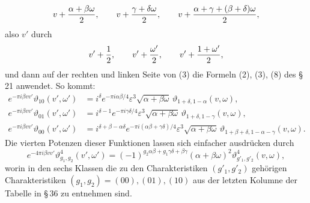 \documentclass[11pt]{article}
\providecommand{\tht}{\vartheta}
\begin{document}
\[
v+{\alpha+
\beta\omega\over2},
\qquad
v+{\gamma+\delta\omega\over2},
\qquad
v+{\alpha+
\gamma+(
\beta+
\delta)\omega\over2},
\]
also $v\prime$ durch
\[
v'+{1\over2},
\qquad v'+{\omega'\over2},
\qquad v'+{1+
\omega'\over2},
\]
und dann auf der rechten und linken Seite von (3) die Formeln (2), (3), (8) des \S\,21 anwendet. So kommt:
\begin{align}
e^{-\pi i\beta vv'}\tht_{10}(v',\omega')
&=i^\delta e^{-\pi i\alpha\beta/4}\varepsilon^3\sqrt{\alpha+
\beta\omega}\,\tht_{1+
\delta,1-
\alpha}(v,
\omega), \tag{4}\\
e^{-\pi i\beta vv'}\tht_{01}(v',\omega')
&=i^{\delta-1}e^{-\pi i\gamma\delta/4}\varepsilon^3\sqrt{\alpha+
\beta\omega}\,\tht_{1+
\delta,1-
\gamma}(v,
\omega), \tag{5}\\
e^{-\pi i\beta vv'}\tht_{00}(v',\omega')
&=i^{\delta+
\beta-
\alpha\delta}e^{-\pi i(
\alpha\beta+
\gamma\delta)/4}\varepsilon^3\sqrt{\alpha+
\beta\omega}\,
\tht_{1+
\beta+
\delta,1-
\alpha-
\gamma}(v,
\omega). \tag{6}
\end{align}
Die vierten Potenzen dieser Funktionen lassen sich einfacher ausdrücken durch
\begin{equation}
e^{-4\pi i\beta vv'}\tht_{g_1,g_2}^4(v',\omega')
=(-1)^{g_2\alpha\beta+g_1\gamma\delta+\beta\gamma}(
\alpha+
\beta\omega)^2\tht_{g'_1,g'_2}^4(v,
\omega),
\tag{7}
\end{equation}
worin in den sechs Klassen die zu den Charakteristiken $(g\prime_1,g\prime_2)$ gehörigen Charakteristiken $(g_1,g_2)=(00),(01),(10)$ aus der letzten Kolumne der Tabelle in \S\,36 zu entnehmen sind.
\end{document}
